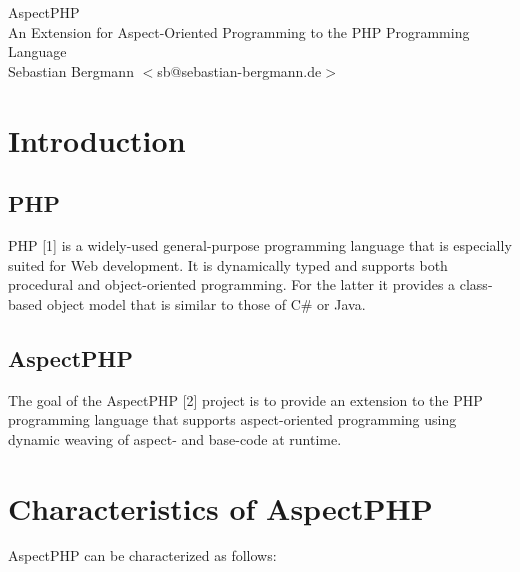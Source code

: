 \documentclass[portrait,a0]{a0poster}
\begin{document}
\lstset{language=PHP,showstringspaces=false}

\renewcommand{\columnfrac}{.45}
\begin{header}
\begin{center}

\VeryHuge
AspectPHP\\
\huge
An Extension for Aspect-Oriented Programming to the PHP Programming Language\\
\LARGE
Sebastian Bergmann $<$sb@sebastian-bergmann.de$>$
\end{center}
\end{header}

\begin{poster}

\begin{pcolumn}

\begin{pbox}
\large
  \section{Introduction}

    \subsection{PHP}

      PHP [1] is a widely-used general-purpose programming language that is
      especially suited for Web development. It is dynamically typed and
      supports both procedural and object-oriented programming.
      For the latter it provides a class-based object model that is similar to
      those of C\# or Java.

    \subsection{AspectPHP}

      The goal of the AspectPHP [2] project is to provide an extension to
      the PHP programming language that supports aspect-oriented programming
      using dynamic weaving of aspect- and base-code at runtime.

  \section{Characteristics of AspectPHP}

    AspectPHP can be characterized as follows:

    \begin{enumerate}


\end{enumerate}
\end{pbox}
\end{pcolumn}
\end{poster}
\end{document}
